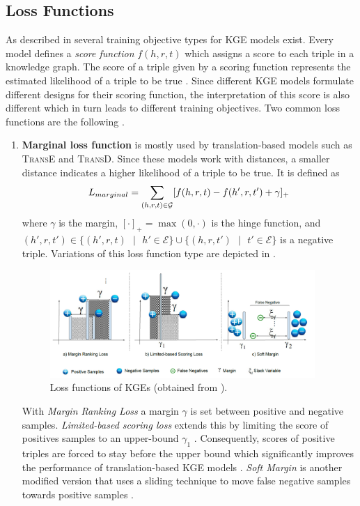 \subsection{Loss Functions} 
\label{subsec:loss_functions}
%
As described in \cite{cai2017kbgan} several training objective types for \ac{KGE} models exist.
Every model defines a \textit{score function} $f(h,r,t)$ which assigns a score to each triple  in a knowledge graph.
The score of a triple given by a scoring function represents the estimated likelihood of a triple to be true \cite{cai2017kbgan}.
Since different \ac{KGE} models formulate different designs for their scoring function, the interpretation of this score is also different which in turn leads to different training objectives.
Two common loss functions are the following \cite{cai2017kbgan}.
\begin{enumerate}
    \item 
    \textbf{Marginal loss function} is mostly used by translation-based models such as \textsc{TransE} and \textsc{TransD}.
    Since these models work with distances, a smaller distance indicates a higher likelihood of a triple to be true.
    It is defined as 
    \begin{equation}
        L_{marginal}=\sum_{(h,r,t)\in\mathcal{G}}[f(h,r,t)-f(h',r,t')+\gamma]_+\label{eq:marginalloss}
    \end{equation}
    where $\gamma$ is the margin, $[\cdot]_+=\max(0, \cdot)$ is the hinge function, and $(h',r,t') \in \{(h',r,t)\text{ }|\text{ }h' \in \mathcal{E}\} \cup \{(h,r,t')\text{ }|\text{ }t' \in \mathcal{E}\}$ is a negative triple.
    Variations of this loss function type are depicted in .
    \begin{figure}[t]
      \centering
        \includegraphics[width=0.95\textwidth]{figures/loss_functions.PNG}
      \caption{Loss functions of \acp{KGE} (obtained from \cite{9207513}).}
      \label{fig:loss_functions}
    \end{figure}
    With \textit{Margin Ranking Loss} a margin $\gamma$ is set between positive and negative samples.
    \textit{Limited-based scoring loss} extends this by limiting the score of positives samples to an upper-bound $\gamma_1$ \cite{9207513}.
    Consequently, scores of positive triples are forced to stay before the upper bound which
    significantly improves the performance of translation-based KGE models \cite{9207513}.
    \textit{Soft Margin} is another modified version that uses a sliding technique to move false negative samples towards positive samples \cite{9207513}.     
    

\end{enumerate}
